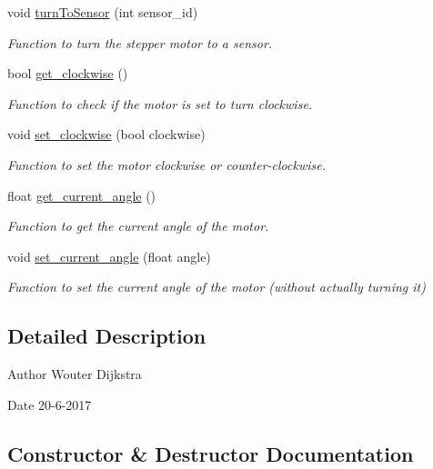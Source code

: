 \begin{DoxyCompactItemize}
void \hyperlink{class_stepper_a9d6eeff6e62711bc18115d4a6a1d5ac2}{turn\+To\+Sensor} (int sensor\+\_\+id)
\begin{DoxyCompactList}\small\item\em Function to turn the stepper motor to a sensor. \end{DoxyCompactList}\item 
bool \hyperlink{class_stepper_a4a596ed212719bd7011f9e0dd9fb7048}{get\+\_\+clockwise} ()
\begin{DoxyCompactList}\small\item\em Function to check if the motor is set to turn clockwise. \end{DoxyCompactList}\item 
void \hyperlink{class_stepper_afbd27ef66b7c41d7d70849ed2a2eedc5}{set\+\_\+clockwise} (bool clockwise)
\begin{DoxyCompactList}\small\item\em Function to set the motor clockwise or counter-\/clockwise. \end{DoxyCompactList}\item 
float \hyperlink{class_stepper_aa784ae1f9988bb3fb853b9cda8ec3d42}{get\+\_\+current\+\_\+angle} ()
\begin{DoxyCompactList}\small\item\em Function to get the current angle of the motor. \end{DoxyCompactList}\item 
void \hyperlink{class_stepper_af07083ac8e9b0f36c3d2384fa922f7db}{set\+\_\+current\+\_\+angle} (float angle)
\begin{DoxyCompactList}\small\item\em Function to set the current angle of the motor (without actually turning it) \end{DoxyCompactList}\end{DoxyCompactItemize}


\subsection{Detailed Description}
\begin{DoxyAuthor}{Author}
Wouter Dijkstra 
\end{DoxyAuthor}
\begin{DoxyDate}{Date}
20-\/6-\/2017 
\end{DoxyDate}


\subsection{Constructor \& Destructor Documentation}
\mbox{\label{class_stepper_a83d8d84ea34c97fb66addd0d38ca67ef}} 
